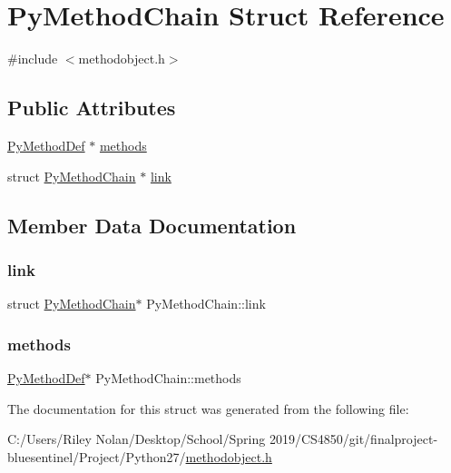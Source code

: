 \hypertarget{struct_py_method_chain}{}\section{Py\+Method\+Chain Struct Reference}
\label{struct_py_method_chain}


{\ttfamily \#include $<$methodobject.\+h$>$}

\subsection*{Public Attributes}
\begin{DoxyCompactItemize}
\item 
\mbox{\hyperlink{struct_py_method_def}{Py\+Method\+Def}} $\ast$ \mbox{\hyperlink{struct_py_method_chain_a148c2061a00a1f5fbbfc8c3cc11f26c0}{methods}}
\item 
struct \mbox{\hyperlink{struct_py_method_chain}{Py\+Method\+Chain}} $\ast$ \mbox{\hyperlink{struct_py_method_chain_af8ce8bbd88fb254e05f7528afc078fbb}{link}}
\end{DoxyCompactItemize}


\subsection{Member Data Documentation}
\mbox{\label{struct_py_method_chain_af8ce8bbd88fb254e05f7528afc078fbb}} 
\subsubsection{\texorpdfstring{link}{link}}
{\footnotesize\ttfamily struct \mbox{\hyperlink{struct_py_method_chain}{Py\+Method\+Chain}}$\ast$ Py\+Method\+Chain\+::link}

\mbox{\label{struct_py_method_chain_a148c2061a00a1f5fbbfc8c3cc11f26c0}} 
\subsubsection{\texorpdfstring{methods}{methods}}
{\footnotesize\ttfamily \mbox{\hyperlink{struct_py_method_def}{Py\+Method\+Def}}$\ast$ Py\+Method\+Chain\+::methods}



The documentation for this struct was generated from the following file\+:\begin{DoxyCompactItemize}
\item 
C\+:/\+Users/\+Riley Nolan/\+Desktop/\+School/\+Spring 2019/\+C\+S4850/git/finalproject-\/bluesentinel/\+Project/\+Python27/\mbox{\hyperlink{methodobject_8h}{methodobject.\+h}}\end{DoxyCompactItemize}
